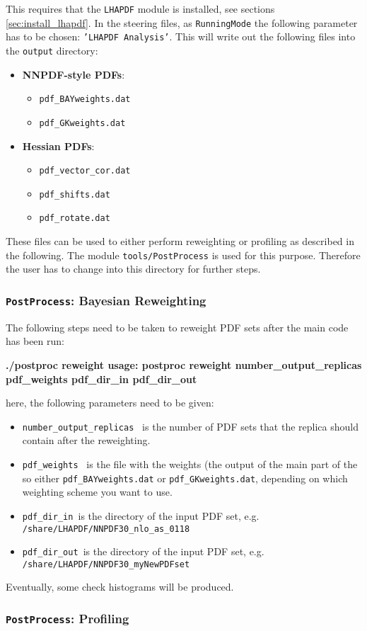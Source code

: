 This requires that the {\tt LHAPDF} module is installed, see sections \ref{sec:install_lhapdf}. In the \fitter steering files, as {\tt RunningMode} the following parameter has to be chosen: {\tt 'LHAPDF Analysis'}. This will write out the following files into the {\tt output} directory:

\begin{itemize}
 \item \textbf{NNPDF-style PDFs}:
 \begin{itemize}
  \item {\tt pdf\_BAYweights.dat}
  \item {\tt pdf\_GKweights.dat}
 \end{itemize}
  \item \textbf{Hessian PDFs}:
 \begin{itemize}
   \item {\tt{pdf\_vector\_cor.dat}}
   \item {\tt{pdf\_shifts.dat}}
   \item {\tt{pdf\_rotate.dat}}  
\end{itemize}
\end{itemize}


These files can be used to either perform reweighting or profiling as described in the following. The module {\tt tools/PostProcess} is used for this purpose. Therefore the user has to change into this directory for further steps. 

\subsubsection{{\tt PostProcess}: Bayesian Reweighting}

The following steps need to be taken to reweight PDF sets after the main code has been run:

\textbf{./postproc reweight
usage: postproc reweight number\_output\_replicas pdf\_weights pdf\_dir\_in pdf\_dir\_out}

here, the following parameters need to be given:
\begin{itemize}
\item {\tt number\_output\_replicas } is the number of PDF sets that the replica should contain after the reweighting. 
\item {\tt pdf\_weights  } is the file with the weights (the output of the main part of the \fitter so either {\tt pdf\_BAYweights.dat} or {\tt pdf\_GKweights.dat}, depending on which weighting scheme you want to use.
\item {\tt pdf\_dir\_in }is the directory of the input PDF set, e.g. {\tt /share/LHAPDF/NNPDF30\_nlo\_as\_0118}
\item {\tt pdf\_dir\_out }is the directory of the input PDF set, e.g. {\tt /share/LHAPDF/NNPDF30\_myNewPDFset}
\end{itemize}

Eventually, some check histograms will be produced.

\subsubsection{{\tt PostProcess}: Profiling}


